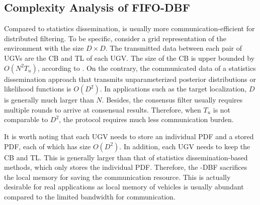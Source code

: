	\subsection{Complexity Analysis of FIFO-DBF}\label{subsec:complexity}
	Compared to statistics dissemination, {\proto} is usually more communication-efficient for distributed filtering. 
	To be specific, consider a grid representation of the environment with the size $D\times D$. %
	The transmitted data between each pair of UGVs are the CB and TL of each UGV.
	The size of the CB is upper bounded by $O(N^2T_u)$, according to .
	On the contrary, the communicated data of a statistics dissemination approach that transmits unparameterized posterior distributions or likelihood functions is $O(D^2)$.
	In applications such as the target localization, $D$ is generally much larger than $N$. 
	Besides, the consensus filter usually requires multiple rounds to arrive at consensual results.
	Therefore, when $T_u$ is not comparable to $D^2$, the {\proto} protocol requires much less communication burden.
	
	It is worth noting that each UGV needs to store an individual PDF and a stored PDF, each of which has size $O(D^2)$. 
	In addition, each UGV needs to keep the CB and TL.
	This is generally larger than that of statistics dissemination-based methods, which only stores the individual PDF.
	Therefore, the \proto-DBF sacrifices the local memory for saving the communication resource.
	This is actually desirable for real applications as local memory of vehicles is usually abundant compared to the limited bandwidth for communication.
	

